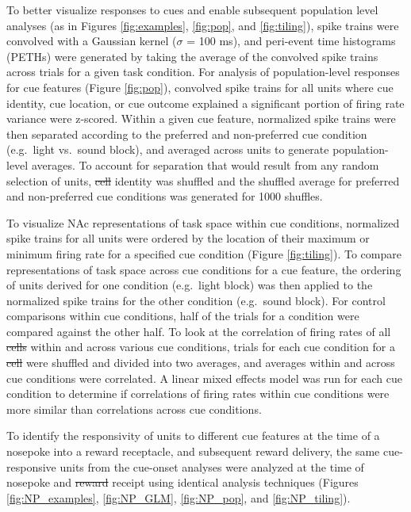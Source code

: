 \documentclass[11pt]{article}
\providecommand{\DIFadd}[1]{{\protect\color{blue}\uwave{#1}}} %
\providecommand{\DIFdel}[1]{{\protect\color{red}\sout{#1}}}                      %
\providecommand{\DIFaddbegin}{} %
\providecommand{\DIFaddend}{} %
\providecommand{\DIFdelbegin}{} %
\providecommand{\DIFdelend}{} %
\newcommand{\DIFscaledelfig}{0.5}
\newlength{\DIFdelgraphicswidth} %
\newlength{\DIFdelgraphicsheight} %
\newcommand{\DIFaddincludegraphics}[2][]{{\color{blue}\fbox{\DIFOincludegraphics[#1]{#2}}}} %
\newcommand{\DIFdelincludegraphics}[2][]{%
\sbox{\DIFdelgraphicsbox}{\DIFOincludegraphics[#1]{#2}}%
\settoboxwidth{\DIFdelgraphicswidth}{\DIFdelgraphicsbox} %
\settoboxtotalheight{\DIFdelgraphicsheight}{\DIFdelgraphicsbox} %
\scalebox{\DIFscaledelfig}{%
\parbox[b]{\DIFdelgraphicswidth}{\usebox{\DIFdelgraphicsbox}\\[-\baselineskip] \rule{\DIFdelgraphicswidth}{0em}}\llap{\resizebox{\DIFdelgraphicswidth}{\DIFdelgraphicsheight}{%
\setlength{\unitlength}{\DIFdelgraphicswidth}%
\begin{picture}(1,1)%
\thicklines\linethickness{2pt} %
{\color[rgb]{1,0,0}\put(0,0){\framebox(1,1){}}}%
{\color[rgb]{1,0,0}\put(0,0){\line( 1,1){1}}}%
{\color[rgb]{1,0,0}\put(0,1){\line(1,-1){1}}}%
\end{picture}%
}\hspace*{3pt}}} %
} %
\DeclareRobustCommand{\DIFaddbegin}{\DIFOaddbegin \let\includegraphics\DIFaddincludegraphics} %
\DeclareRobustCommand{\DIFaddend}{\DIFOaddend \let\includegraphics\DIFOincludegraphics} %
\DeclareRobustCommand{\DIFdelbegin}{\DIFOdelbegin \let\includegraphics\DIFdelincludegraphics} %
\DeclareRobustCommand{\DIFdelend}{\DIFOaddend \let\includegraphics\DIFOincludegraphics} %
\begin{document}
{To better visualize responses to cues and enable subsequent population
level analyses (as in Figures \ref{fig:examples}, \ref{fig:pop}, and
\ref{fig:tiling}), spike trains were convolved with a Gaussian kernel
($\sigma$ = 100 ms), and peri-event time histograms (PETHs) were
generated by taking the average of the convolved spike trains across \DIFaddbegin \DIFadd{all
}\DIFaddend trials for a given task condition. For analysis of population-level
responses for cue features (Figure \ref{fig:pop}), convolved spike
trains for all units where cue identity, cue location, or cue outcome
explained a significant portion of firing rate variance were
z-scored. Within a given cue feature, normalized spike trains were
then separated according to the preferred and non-preferred cue
condition (e.g.\ light vs.\ sound block), and averaged across units to
generate population-level averages. To account for separation that
would result from any random selection of units, \DIFdelbegin \DIFdel{cell }\DIFdelend \DIFaddbegin \DIFadd{unit }\DIFaddend identity was
shuffled and the shuffled average for preferred and non-preferred cue
conditions was generated for 1000 shuffles.

To visualize NAc representations of task space within cue conditions,
normalized spike trains for all units were ordered by the location of
their maximum or minimum firing rate for a specified cue condition
(Figure \ref{fig:tiling}). To compare representations of task space
across cue conditions for a cue feature, the ordering of units derived
for one condition (e.g.\ light block) was then applied to the
normalized spike trains for the other condition (e.g.\ sound
block). For control comparisons within cue conditions, half of the
trials for a condition were compared against the other half. To look
at the correlation of firing rates of all \DIFdelbegin \DIFdel{cells }\DIFdelend \DIFaddbegin \DIFadd{units }\DIFaddend within and across
various cue conditions, trials for each cue condition for a \DIFdelbegin \DIFdel{cell }\DIFdelend \DIFaddbegin \DIFadd{unit }\DIFaddend were
shuffled and divided into two averages, and averages within and across
cue conditions were correlated. A linear mixed effects model was run
for each cue condition to determine if correlations of firing rates
within cue conditions were more similar than correlations across cue
conditions.

To identify the responsivity of units to different cue features at the
time of a nosepoke into a reward receptacle, and subsequent reward
delivery, the same cue-responsive units from the cue-onset analyses
were analyzed at the time of nosepoke and \DIFdelbegin \DIFdel{reward }\DIFdelend \DIFaddbegin \DIFadd{outcome }\DIFaddend receipt using
identical analysis techniques (Figures \ref{fig:NP_examples},
\ref{fig:NP_GLM}, \ref{fig:NP_pop}, and \ref{fig:NP_tiling}).

}
\end{document}
